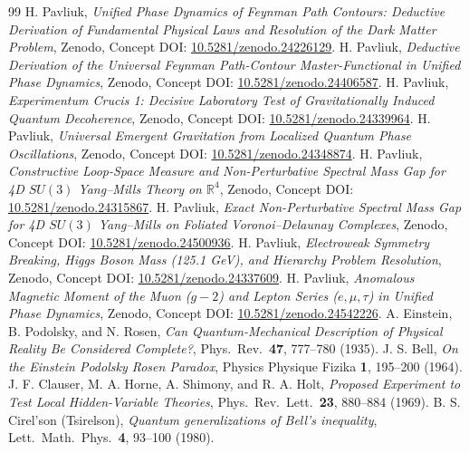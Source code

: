 \documentclass[11pt,a4paper]{article}
\begin{document}
\begin{thebibliography}{99}
 H. Pavliuk, \textit{Unified Phase Dynamics of Feynman Path Contours: Deductive Derivation of Fundamental Physical Laws and Resolution of the Dark Matter Problem}, Zenodo, Concept DOI: \href{https://doi.org/10.5281/zenodo.24226129}{10.5281/zenodo.24226129}.
 H. Pavliuk, \textit{Deductive Derivation of the Universal Feynman Path-Contour Master-Functional in Unified Phase Dynamics}, Zenodo, Concept DOI: \href{https://doi.org/10.5281/zenodo.24406587}{10.5281/zenodo.24406587}.
 H. Pavliuk, \textit{Experimentum Crucis 1: Decisive Laboratory Test of Gravitationally Induced Quantum Decoherence}, Zenodo, Concept DOI: \href{https://doi.org/10.5281/zenodo.24339964}{10.5281/zenodo.24339964}.
 H. Pavliuk, \textit{Universal Emergent Gravitation from Localized Quantum Phase Oscillations}, Zenodo, Concept DOI: \href{https://doi.org/10.5281/zenodo.24348874}{10.5281/zenodo.24348874}.
 H. Pavliuk, \textit{Constructive Loop-Space Measure and Non-Perturbative Spectral Mass Gap for 4D $SU(3)$ Yang--Mills Theory on $\mathbb{R}^4$}, Zenodo, Concept DOI: \href{https://doi.org/10.5281/zenodo.24315867}{10.5281/zenodo.24315867}.
 H. Pavliuk, \textit{Exact Non-Perturbative Spectral Mass Gap for 4D $SU(3)$ Yang--Mills on Foliated Voronoi--Delaunay Complexes}, Zenodo, Concept DOI: \href{https://doi.org/10.5281/zenodo.24500936}{10.5281/zenodo.24500936}.
 H. Pavliuk, \textit{Electroweak Symmetry Breaking, Higgs Boson Mass (125.1 GeV), and Hierarchy Problem Resolution}, Zenodo, Concept DOI: \href{https://doi.org/10.5281/zenodo.24337609}{10.5281/zenodo.24337609}.
 H. Pavliuk, \textit{Anomalous Magnetic Moment of the Muon ($g-2$) and Lepton Series ($e,\mu,\tau$) in Unified Phase Dynamics}, Zenodo, Concept DOI: \href{https://doi.org/10.5281/zenodo.24542226}{10.5281/zenodo.24542226}.
 A. Einstein, B. Podolsky, and N. Rosen, \textit{Can Quantum-Mechanical Description of Physical Reality Be Considered Complete?}, Phys.\ Rev.\ \textbf{47}, 777--780 (1935).
 J. S. Bell, \textit{On the Einstein Podolsky Rosen Paradox}, Physics Physique Fizika \textbf{1}, 195--200 (1964).
 J. F. Clauser, M. A. Horne, A. Shimony, and R. A. Holt, \textit{Proposed Experiment to Test Local Hidden-Variable Theories}, Phys.\ Rev.\ Lett.\ \textbf{23}, 880--884 (1969).
 B. S. Cirel'son (Tsirelson), \textit{Quantum generalizations of Bell's inequality}, Lett.\ Math.\ Phys.\ \textbf{4}, 93--100 (1980).

\end{thebibliography}
\end{document}
